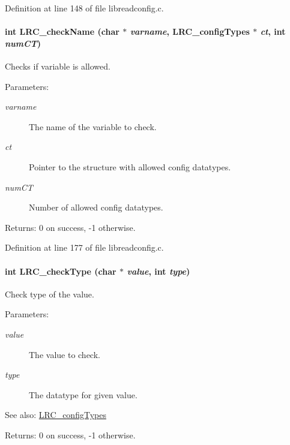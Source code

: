 Definition at line 148 of file libreadconfig.c.\hypertarget{group___l_r_c__internals_g40dad9664f69eed3491f5753db5a76b0}{
\paragraph[{LRC\_\-checkName}]{\setlength{\rightskip}{0pt plus 5cm}int LRC\_\-checkName (char $\ast$ {\em varname}, \/  {\bf LRC\_\-configTypes} $\ast$ {\em ct}, \/  int {\em numCT})}\hfill}
\label{group___l_r_c__internals_g40dad9664f69eed3491f5753db5a76b0}


Checks if variable is allowed. 

\begin{Desc}
\item[Parameters:]
\begin{description}
\item[{\em varname}]The name of the variable to check.\item[{\em ct}]Pointer to the structure with allowed config datatypes.\item[{\em numCT}]Number of allowed config datatypes.\end{description}
\end{Desc}
\begin{Desc}
\item[Returns:]0 on success, -1 otherwise. \end{Desc}


Definition at line 177 of file libreadconfig.c.\hypertarget{group___l_r_c__internals_g727eec2e862e3acf7206d11cd2636127}{
\paragraph[{LRC\_\-checkType}]{\setlength{\rightskip}{0pt plus 5cm}int LRC\_\-checkType (char $\ast$ {\em value}, \/  int {\em type})}\hfill}
\label{group___l_r_c__internals_g727eec2e862e3acf7206d11cd2636127}


Check type of the value. 

\begin{Desc}
\item[Parameters:]
\begin{description}
\item[{\em value}]The value to check.\item[{\em type}]The datatype for given value. \end{description}
\end{Desc}
\begin{Desc}
\item[See also:]\hyperlink{struct_l_r_c__config_types}{LRC\_\-configTypes}\end{Desc}
\begin{Desc}
\item[Returns:]0 on success, -1 otherwise. \end{Desc}


